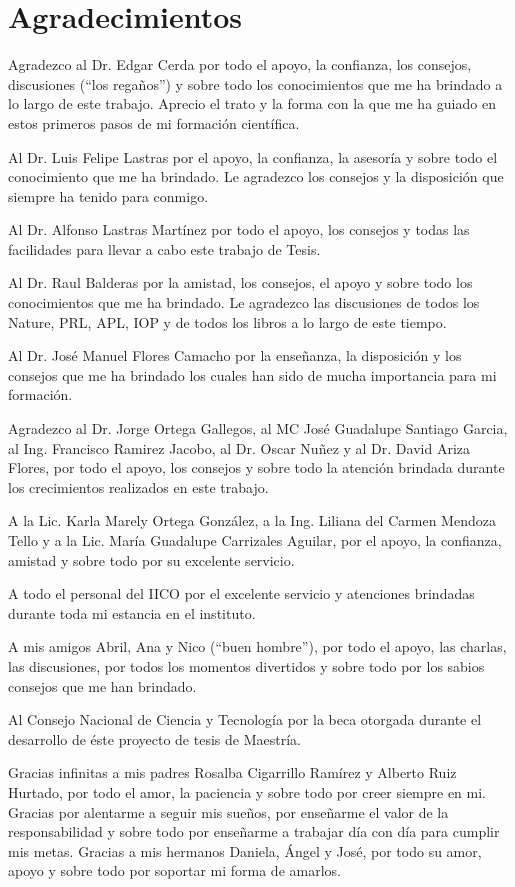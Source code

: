 \chapter{Agradecimientos}%

Agradezco al Dr. Edgar Cerda por todo el apoyo, la confianza, los consejos, discusiones (``los regaños'') y sobre todo los conocimientos  que me ha brindado a lo largo de este trabajo. Aprecio el trato y la forma con la que me ha guiado en estos primeros pasos de mi formación científica. 
 
Al Dr. Luis Felipe Lastras por  el apoyo, la confianza, la asesoría y sobre todo el conocimiento que me ha brindado. Le agradezco los consejos y la disposición que siempre ha tenido para conmigo. 

Al Dr. Alfonso Lastras Martínez  por todo el apoyo, los consejos y todas las facilidades para llevar a cabo este trabajo de Tesis. 

Al Dr. Raul Balderas  por la amistad, los consejos, el apoyo y sobre todo los conocimientos que me ha brindado. Le agradezco las  discusiones de todos los  Nature, PRL, APL, IOP y de todos los libros a lo largo de este tiempo. 

Al Dr. José Manuel Flores Camacho  por la enseñanza, la disposición y los consejos que me ha brindado los cuales han sido de mucha importancia para mi formación. 

Agradezco  al Dr. Jorge Ortega Gallegos, al  MC José Guadalupe Santiago Garcia, al Ing. Francisco Ramirez Jacobo, al Dr. Oscar Nuñez y al Dr. David Ariza Flores,  por todo el apoyo, los consejos y sobre todo la atención brindada durante los crecimientos realizados en este trabajo. 

A la Lic. Karla Marely Ortega González, a la Ing. Liliana del Carmen Mendoza Tello y a la Lic. Mar\'ia Guadalupe Carrizales Aguilar,  por el apoyo, la confianza, amistad  y sobre todo por su  excelente servicio.  

A todo el personal del IICO por el excelente servicio y atenciones brindadas durante toda mi estancia en el instituto.  

A mis amigos Abril, Ana y Nico (``buen hombre''), por todo el apoyo, las charlas, las discusiones, por todos los momentos divertidos y sobre todo por los sabios consejos que me han brindado.  

Al Consejo Nacional de Ciencia y Tecnología por la beca otorgada durante el desarrollo
de \'este proyecto de tesis de Maestr\'ia. 

Gracias infinitas  a mis padres Rosalba Cigarrillo Ramírez y Alberto Ruiz Hurtado, por todo el amor, la paciencia y sobre todo por creer siempre en mi. Gracias por alentarme a seguir mis sueños, por enseñarme el valor de la responsabilidad y sobre todo por enseñarme a trabajar día con día para cumplir mis metas. Gracias a mis hermanos Daniela, Ángel y José, por todo su amor, apoyo y sobre todo por soportar mi forma de amarlos.

